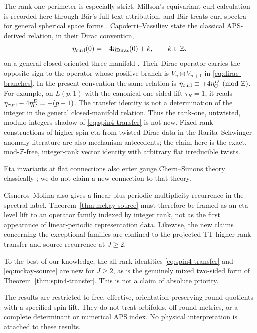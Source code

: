 \documentclass[11pt]{article}
\theoremstyle{definition}
\begin{document}
The rank-one perimeter is especially strict.  Millson's equivariant curl
calculation is recorded here through B\"ar's full-text attribution, and
B\"ar treats curl spectra for general spherical space forms
\cite{Bar2019}.  Capoferri--Vassiliev state the classical APS-derived
relation, in their Dirac convention,
\[
 \eta_{\rm curl}(0)=-4\eta_{\rm Dirac}(0)+k,\qquad k\in\mathbb Z,
\]
on a general closed oriented three-manifold
\cite[Rem.~D.4(ii)--(iii)]{CapoferriVassiliev2023}.  Their Dirac operator
carries the opposite sign to the operator whose positive branch is
$V_n\boxtimes V_{n+1}$ in \eqref{eq:dirac-branches}.
In the present convention the same relation is
$\eta_{\rm curl}\equiv+4\eta^D_C\pmod{\mathbb Z}$.  For example, on
$L(p,1)$ with the canonical one-sided lift $\tau_R=1$, it reads
$\eta_{\rm curl}-4\eta^D_C=-(p-1)$.
The transfer identity is not a determination of the integer in the general
closed-manifold relation.  Thus the rank-one,
untwisted, modulo-integers shadow of
\eqref{eq:spin4-transfer} is not new.  Fixed-rank constructions of
higher-spin eta from twisted Dirac data in the Rarita--Schwinger anomaly
literature are also mechanism antecedents; the claim here is the exact,
mod-$\mathbb Z$-free, integer-rank vector identity with arbitrary flat
irreducible twists.

Eta invariants at flat connections also enter gauge Chern--Simons theory
classically \cite{Jeffrey1992}; we do not claim a new connection to that
theory.

Cisneros--Molina also gives a linear-plus-periodic multiplicity recurrence in
the spectral label.  Theorem~\ref{thm:mckay-source} must therefore be framed
as an eta-level lift to an operator family indexed by integer rank, not as the
first appearance of linear-periodic representation data.  Likewise, the new
claims concerning the exceptional families are confined to the projected-TT
higher-rank transfer and source recurrence at $J\geq2$.

To the best of our knowledge, the all-rank identities
\eqref{eq:spin4-transfer} and \eqref{eq:mckay-source} are new for $J\geq2$,
as is the genuinely mixed two-sided form of
Theorem~\ref{thm:spin4-transfer}.  This is not a claim of absolute priority.

The results are restricted to free, effective, orientation-preserving round
quotients with a specified spin lift.  They do not treat orbifolds, off-round
metrics, or a complete determinant or numerical APS index.
No physical interpretation is attached to these results.
\end{document}
